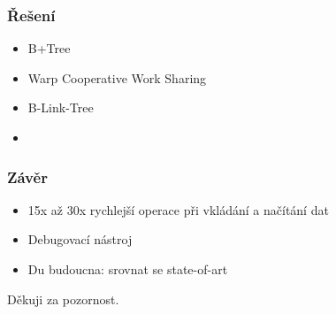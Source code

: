 \documentclass[aspectratio=169]{beamer}
\begin{document}
\begin{frame}
  \frametitle{Řešení}
  \begin{itemize}
    \item B+Tree
    \item Warp Cooperative Work Sharing
    \item B-Link-Tree
    \item
  \end{itemize}
\end{frame}

\begin{frame}
  \frametitle{Závěr}
  \begin{itemize}
    \item 15x až 30x rychlejší operace při vkládání a načítání dat
    \item Debugovací nástroj
    \item Du budoucna: srovnat se state-of-art
  \end{itemize}
\end{frame}

{
  \begin{frame}
    \LARGE{Děkuji za pozornost.}
  \end{frame}
}
\end{document}
